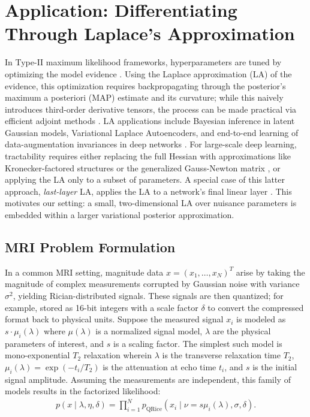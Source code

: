 \documentclass{article}
\begin{document}
\section{Application: Differentiating Through Laplace's Approximation}

In Type-II maximum likelihood frameworks, hyperparameters are tuned by optimizing the model evidence \citep{mackay_bayesian_1992}.
Using the Laplace approximation (LA) of the evidence, this optimization requires backpropagating through the posterior's maximum a posteriori (MAP) estimate and its curvature;
while this naively introduces third-order derivative tensors, the process can be made practical via efficient adjoint methods \citep{margossian_hamiltonian_2020}.
LA applications include Bayesian inference in latent Gaussian models, Variational Laplace Autoencoders, and end-to-end learning of data-augmentation invariances in deep networks \citep{margossian_hamiltonian_2020, park_variational_2019, immer_invariance_2022}.
For large-scale deep learning, tractability requires either replacing the full Hessian with approximations like Kronecker-factored structures or the generalized Gauss-Newton matrix \citep{ritter_scalable_2018, immer_improving_2021}, or applying the LA only to a subset of parameters.
A special case of this latter approach, \textit{last-layer} LA, applies the LA to a network's final linear layer \citep{kristiadi_being_2020, daxberger_laplace_2021}.
This motivates our setting:
a small, two-dimensional LA over nuisance parameters is embedded within a larger variational posterior approximation.

\subsection{MRI Problem Formulation}

In a common MRI setting, magnitude data $x = (x_1, \ldots, x_N)^T$ arise by taking the magnitude of complex measurements corrupted by Gaussian noise with variance $\sigma^2$, yielding Rician-distributed signals.
These signals are then quantized;
for example, stored as 16-bit integers with a scale factor $\delta$ to convert the compressed format back to physical units.
Suppose the measured signal $x_i$ is modeled as $s \cdot \mu_i(\lambda)$ where $\mu(\lambda)$ is a normalized signal model, $\lambda$ are the physical parameters of interest, and $s$ is a scaling factor.
The simplest such model is mono-exponential $T_2$ relaxation wherein $\lambda$ is the transverse relaxation time $T_2$, $\mu_i(\lambda) = \exp(-t_i/T_2)$ is the attenuation at echo time $t_i$, and $s$ is the initial signal amplitude.
Assuming the measurements are independent, this family of models results in the factorized likelihood:
%
\begin{align}\label{eq:likelihood}
  p(x \mid \lambda, \eta, \delta) = \prod_{i=1}^N p_{\mathrm{QRice}}(x_i \mid \nu = s \mu_i(\lambda), \sigma, \delta).
\end{align}
\end{document}
